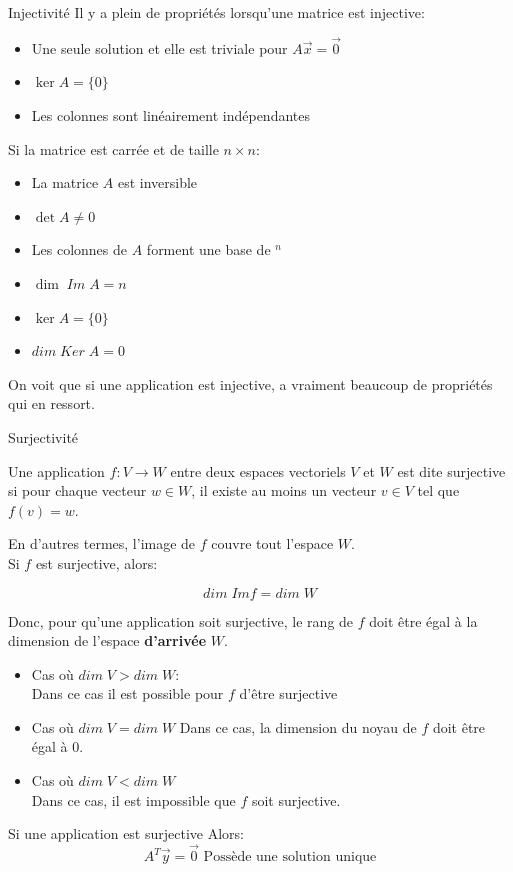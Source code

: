 \begin{parag}{Injectivité}
    Il y a plein de propriétés lorsqu'une matrice est injective:
    \begin{truc}
        \begin{itemize}
            \item Une seule solution et elle est triviale pour $A\vec{x} = \vec{0}$
            \item $\ker A = \{0\}$
            \item Les colonnes sont linéairement indépendantes
        \end{itemize}
        Si la matrice est carrée et de taille $n \times n$:
        \begin{itemize}
            \item La matrice $A$ est inversible
            \item $\det A \neq 0$
            \item Les colonnes de $A$ forment une base de \R$^n$
            \item $\dim\; Im\; A = n$
            \item $\ker A = \{0\}$
            \item $dim\; Ker\; A = 0$
        \end{itemize}
    \end{truc}
    On voit que si une application est injective, a vraiment beaucoup de propriétés qui en ressort.
\end{parag}

\begin{parag}{Surjectivité}
    \begin{truc}
        Une application $f : V \to W$ entre deux espaces vectoriels $V$ et $W$ est dite surjective si pour chaque vecteur $w \in W$, il existe au moins un vecteur $v \in V$ tel que $f(v) = w$.
    \end{truc}
     En d'autres termes, l'image de $f$ couvre tout l'espace $W$.
    \\
    Si $f$  est surjective, alors:
    \begin{truc}
        \[dim\; Imf = dim\; W\]
    \end{truc}  
    Donc, pour qu'une application soit surjective, le rang de $f$ doit être égal à la dimension de l'espace \textbf{d'arrivée} $W$.
    \begin{itemize}
        \item Cas où $dim\;V > dim\;W$:
        \\
        Dans ce cas il est possible pour $f$ d'être surjective
        \item Cas où $dim\;V = dim\;W$
        Dans ce cas, la dimension du noyau de $f$ doit être égal à $0$. 
        \item Cas où $dim \; V < dim\; W$
        \\
        Dans ce cas, il est impossible que $f$ soit surjective.
    \end{itemize}
    \begin{truc}
        Si une application est surjective Alors:
        \[A^T\vec{y} = \vec{0} \text{ Possède une solution unique}\]
        
    \end{truc}
\end{parag}

